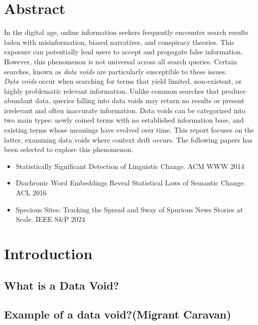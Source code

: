 \documentclass[12pt]{article}
\begin{document}
\tableofcontents
\newpage

\section{Abstract} \label{sec:abstract}
    In the digital age, online information seekers frequently encounter search results laden with misinformation, biased narratives, and conspiracy theories.
    This exposure can potentially lead users to accept and propagate false information.
    However, this phenomenon is not universal across all search queries.
    Certain searches, known as \textit{data voids} are particularly susceptible to these issues.
    \\
    \textit{Data voids} occur when searching for terms that yield limited, non-existent, or highly problematic relevant information.
    Unlike common searches that produce abundant data, queries falling into data voids may return no results or present irrelevant and often inaccurate information.
    Data voids can be categorized into two main types: newly coined terms with no established information base, and existing terms whose meanings have evolved over time.
    This report focuses on the latter, examining data voids where context drift occurs.
    The following papers has been selected to explore this phenomenon.
    \begin{itemize}
        \item Statistically Significant Detection of Linguistic Change. ACM WWW 2014 \cite{kulkarni2014statistically}
        \item Diachronic Word Embeddings Reveal Statistical Laws of Semantic Change. ACL 2016 \cite{hamilton2018diachronic}
        \item Specious Sites: Tracking the Spread and Sway of Spurious News Stories at Scale. IEEE S\&P 2024 \cite{hanley2024specious}
    \end{itemize}

\section{Introduction} \label{sec:introduction}
\subsection{What is a Data Void?}
\subsection{Example of a data void?(Migrant Caravan)}
\end{document}
